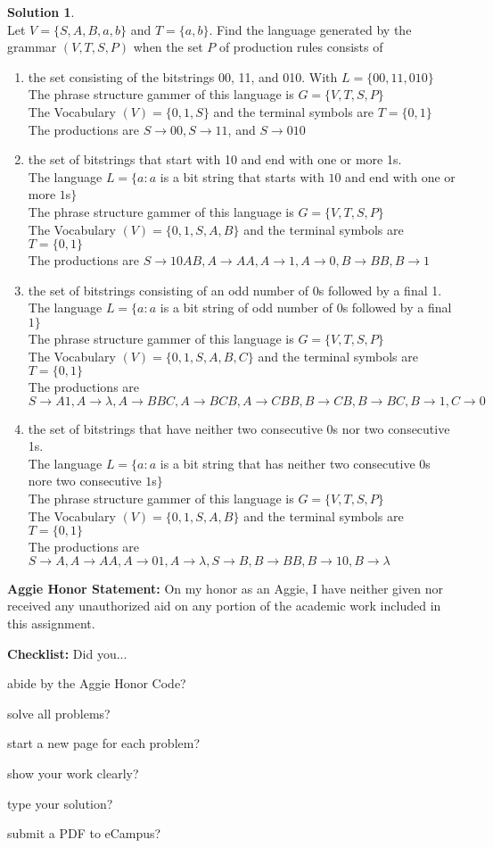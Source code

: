 \documentclass{article}
\theoremstyle{definition}
\newtheorem*{solution}{Solution}
\newcommand{\honor}{\noindent \textbf{Aggie Honor Statement: }On my honor as an Aggie, I have neither
  given nor received any unauthorized aid on any portion of the academic work included in this assignment.
}
\newcommand{\checklist}{\noindent\textbf{Checklist:}
Did you...
\begin{compactenum}
\item abide by the Aggie Honor Code?
\item solve all problems?
\item start a new page for each problem?
\item show your work clearly?
\item type your solution?
\item submit a PDF to eCampus?
\end{compactenum}
}
\begin{document}
\begin{solution}\ \\
  Let $V=\{S,A,B,a,b\}$ and $T=\{a,b\}$.  Find the language generated by the grammar $(V,T,S,P)$ when the set $P$ of production rules consists of
  \begin{enumerate}
  \item the set consisting of the bitstrings 00, 11, and 010.
    With $L = \{ 00, 11, 010\}$ \\
    The phrase structure gammer of this language is $G = \{ V,T,S,P\}$ \\
    The Vocabulary $(V) = \{0,1,S\}$ and the terminal symbols are $T = \{ 0,1\}$ \\
    The productions are $S \to 00, S \to  11$, and $S \to 010$

  \item the set of bitstrings that start with 10 and end with one or more 1s. \\
    The language $L = \{ a: a$ is a bit string that starts with $10$ and end with one or more $1$s$\}$ \\
    The phrase structure gammer of this language is $G = \{ V,T,S,P\}$ \\
    The Vocabulary $(V) = \{0,1,S, A, B\}$ and the terminal symbols are $T = \{ 0,1\}$ \\
    The productions are $S \to 10AB, A \to  AA, A \to 1, A \to 0, B \to BB, B \to 1$

  \item the set of bitstrings consisting of an odd number of 0s followed by a final 1. \\
    The language $L = \{ a: a$ is a bit string of odd number of $0$s followed by a final $1\}$ \\
    The phrase structure gammer of this language is $G = \{ V,T,S,P\}$ \\
    The Vocabulary $(V) = \{0,1,S, A, B, C\}$ and the terminal symbols are $T = \{ 0,1\}$ \\
    The productions are $S \to A1, A \to  \lambda, A \to BBC, A \to BCB, A \to CBB, B \to CB, B \to BC, B \to 1 , C \to 0$

  \item the set of bitstrings that have neither two consecutive 0s nor two consecutive 1s. \\
  The language $L = \{ a: a$ is a bit string that  has neither two consecutive $0$s nore two consecutive $1$s$\}$ \\
  The phrase structure gammer of this language is $G = \{ V,T,S,P\}$ \\
  The Vocabulary $(V) = \{0,1,S, A, B\}$ and the terminal symbols are $T = \{ 0,1\}$ \\
  The productions are $S \to A, A \to  AA, A \to 01, A \to \lambda, S \to B, B \to BB, B \to 10, B \to \lambda$
  \end{enumerate}
\end{solution}
\bigskip
\honor

\bigskip
\checklist
\end{document}
